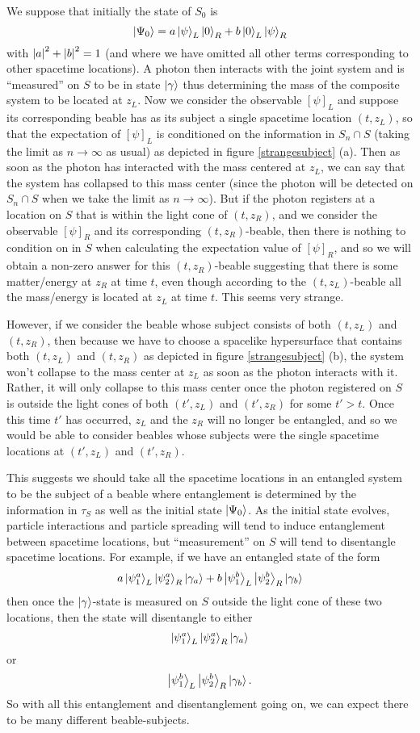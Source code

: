 We suppose that initially the state of $S_0$ is 
$$\ket{\Psi_0}=a\ket{\psi}_L\ket{0}_R+b\ket{0}_L\ket{\psi}_R$$ 
with $\abs{a}^2+\abs{b}^2=1$ (and where we have omitted all other terms corresponding to other spacetime locations). A photon then interacts with the joint system and is ``measured'' on $S$ to be in state $\ket{\gamma}$ thus determining the mass of the composite system to be located at $z_L$. Now we consider the observable $[\psi]_L$ and suppose its corresponding beable has as its subject a single spacetime location $(t,z_L)$, so that the expectation of $[\psi]_L$ is conditioned on the information in $S_n\cap S$ (taking the limit as $n\rightarrow\infty$ as usual) as depicted in figure \ref{strangesubject} (a). Then as soon as the photon has interacted with the mass centered at $z_L$, we can say that the system has collapsed to this mass center (since the photon will be detected on $S_n\cap S$ when we take the limit as $n\rightarrow\infty$). But if the photon registers at a location on $S$ that is within the light cone of $(t, z_R)$, and we consider the observable $[\psi]_R$ and its corresponding $(t, z_R)$-beable, then there is nothing to condition on in $S$ when calculating the expectation value of $[\psi]_R$, and so we will obtain a non-zero answer for this $(t, z_R)$-beable suggesting that there is some matter/energy at $z_R$ at time $t$, even though according to the $(t, z_L)$-beable all the mass/energy is located at $z_L$ at time $t$. This seems very strange. 

However, if we consider the beable whose subject consists of both $(t, z_L)$ and $(t, z_R)$, then because we have to choose a spacelike hypersurface that contains both $(t, z_L)$ and $(t, z_R)$ as depicted in figure \ref{strangesubject} (b), the system won't collapse to the mass center at $z_L$ as soon as the photon interacts with it. Rather, it will only collapse to this mass center once the photon registered on $S$ is outside the light cones of  both $(t', z_L)$ and $(t', z_R)$ for some $t'>t$. Once this time $t'$ has occurred, $z_L$ and the $z_R$ will no longer be entangled, and so we would be able to consider beables whose subjects were the single spacetime locations at $(t', z_L)$ and $(t', z_R)$.

This suggests we should take all the spacetime locations in an entangled system to be the subject of a beable where entanglement is determined by the information in $\tau_S$ as well as the initial state $\ket{\Psi_0}$. As the initial state evolves, particle interactions and particle spreading will tend to induce entanglement between spacetime locations, but ``measurement'' on $S$ will tend to disentangle spacetime locations. For example, if we have an entangled state of the form
$$a\ket{\psi^a_1}_L\ket{\psi^a_2}_R\ket{\gamma_a}+b\ket{\psi^b_1}_L\ket{\psi^b_2}_R\ket{\gamma_b}$$
then once the $\ket{\gamma}$-state is measured on $S$ outside the light cone of these two locations, then the state will disentangle to either 
$$\ket{\psi^a_1}_L\ket{\psi^a_2}_R\ket{\gamma_a}$$
or 
$$\ket{\psi^b_1}_L\ket{\psi^b_2}_R\ket{\gamma_b}.$$
So with all this entanglement and disentanglement going on, we can expect there to be many different beable-subjects.

